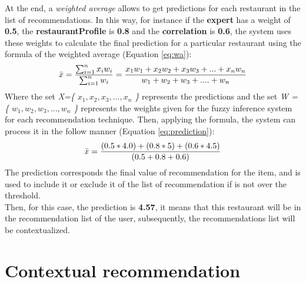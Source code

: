 At the end, a \textit{weighted average} allows to get predictions for
each restaurant in the list of recommendations. In this way, for
instance if the \textbf{expert} has a weight of \textbf{0.5}, the
\textbf{restaurantProfile} is \textbf{0.8} and the
\textbf{correlation} is \textbf{0.6}, the system uses these weights to
calculate the final prediction for a particular restaurant using the
formula of the weighted average (Equation  \ref{eq:wa}):
\begin{equation}\label{eq:wa}
\displaystyle \bar{x} = {\sum_{i=1}^{n} x_{i} w_{i}
\over \sum_{i=1}^{n} w_{i} } = 
{x_{1}w_{1} + x_{2}w_{2} + x_{3}w_{3} + ... + x_{n}w_{n} 
\over w_{1} + w_{2} + w_{3} + .... + w_{n}}
\end{equation}
Where the set \textit{X=\{ $x_{1}, x_{2}, x_{3},...,x_{n}$ \}} represents the 
predictions and the set \textit{W = \{ $w_{1}, w_{2}, w_{3},...,w_{n}$ \} } 
represents the weights 
given for the fuzzy inference system for each recommendation technique. 
Then, applying the formula, the system can process it in the follow manner  
(Equation  \ref{eq:prediction}):
\begin{equation}\label{eq:prediction}
\displaystyle \bar{x}  = {(0.5 * 4.0) + ( 0.8 * 5) + (0.6 * 4.5)
\over (0.5 + 0.8 + 0.6)}
\end{equation}
The prediction corresponds the final value of recommendation for the
item, and is used to include it or exclude it of the list of
recommendation if is not over the threshold. \\ Then, for this case, the
prediction is \textbf{4.57}, it means that this restaurant will be in the
recommendation list of the user, subsequently, the recommendations
list will be contextualized.

\section{Contextual recommendation} 

